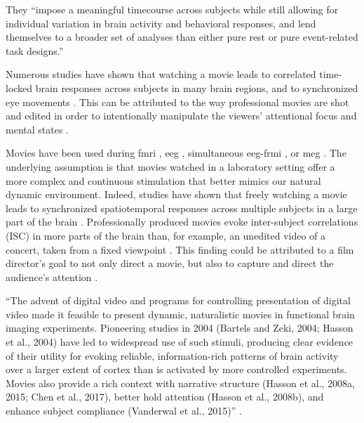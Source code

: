 %
They ``impose a meaningful timecourse across subjects while still allowing for
individual variation in brain activity and behavioral responses, and lend
themselves to a broader set of analyses than either pure rest or pure
event-related task designs.'' \citep{finn2017can}

%
Numerous studies have shown that watching a movie leads to correlated
time-locked brain responses across subjects in many brain regions, and to
synchronized eye movements \citep{hasson2010reliability, lankinen2014isc-meg}.
%
This can be attributed to the way professional movies are shot and edited in
order to intentionally manipulate the viewers' attentional focus and mental
states \citep{brown2012cinematography, dancyger2011film-technique}.

Movies have been used during \ac{fmri} \citep{bartels2004mapping,
hasson2004intersubject}, \ac{eeg} \citep{dmochowski2014audience,
krause2000relative}, simultaneous \ac{eeg}-\ac{frmi}
\citep{whittingstall2010integration}, or \ac{meg} \citep{lankinen2014isc-meg,
luo2010auditory}.
%
The underlying assumption is that movies watched in a laboratory setting offer a
more complex and continuous stimulation that better mimics our natural dynamic
environment.
%
Indeed, studies have shown that freely watching a movie leads to synchronized
spatiotemporal responses across multiple subjects in a large part of the brain
\citep{hasson2010reliability, lankinen2014isc-meg}.
%
Professionally produced movies evoke inter-subject correlations (ISC) in more
parts of the brain than, for example, an unedited video of a concert, taken from
a fixed viewpoint \citep{hasson2010reliability}.
%
This finding could be attributed to a film director's goal to not only direct a
movie, but also to capture and direct the audience's attention
\citep{brown2012cinematography, dancyger2011film-technique}.




``The advent of digital video and programs for controlling presentation of
digital video made it feasible to present dynamic, naturalistic movies in
functional brain imaging experiments. Pioneering studies in 2004 (Bartels and
Zeki, 2004; Hasson et al., 2004) have led to widespread use of such stimuli,
producing clear evidence of their utility for evoking reliable, information-rich
patterns of brain activity over a larger extent of cortex than is activated by
more controlled experiments. Movies also provide a rich context with narrative
structure (Hasson et al., 2008a, 2015; Chen et al., 2017), better hold attention
(Hasson et al., 2008b), and enhance subject compliance (Vanderwal et al.,
2015)'' \citep{haxby2020naturalistic}.

